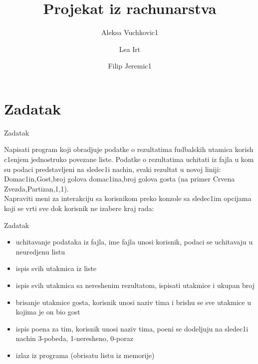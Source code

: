 \documentclass{beamer}
\title{\textbf{Projekat iz rachunarstva}}
\author{Aleksa Vuchkovic1
\and
Lea Irt
\and 
Filip Jeremic1
}
\date{}
\begin{document}
\maketitle
\section{Zadatak}
\begin{frame}{Zadatak}
\begin{block}{}
Napisati program koji obradjuje podatke o rezultatima fudbalskih utamica korish${}$c1enjem jednostruko povezane liste. Podatke o rezultatima uchitati iz fajla u kom su podaci predstavljeni na sledec1i nachin, svaki rezultat u novoj liniji:      
Domac1in,Gost,broj golova domac1ina,broj golova gosta (na primer Crvena Zvezda,Partizan,1,1).\\
Napraviti meni za interakciju sa korisnikom preko konzole sa sledec1im opcijama koji se vrti sve dok korisnik ne izabere kraj rada:
\end{block}
\end{frame}
\begin{frame}{Zadatak}
\begin{itemize}
\item uchitavanje podataka iz fajla, ime fajla unosi korisnik, podaci se uchitavaju u neuredjenu listu
\item ispis svih utakmica iz liste 
\item ispis svih utakmica sa nereshenim rezultatom, ispisati utakmice i ukupan broj
\item brisanje utakmice gosta, korisnik unosi naziv tima i brishu se sve utakmice u kojima je on bio gost 
\item ispis poena za tim, korisnik unosi naziv tima, poeni se dodeljuju na sledec1i nachin 3-pobeda, 1-neresheno, 0-poraz
\item izlaz iz programa (obrisatu listu iz memorije)
\end{itemize}
\end{frame}
\end{document}
